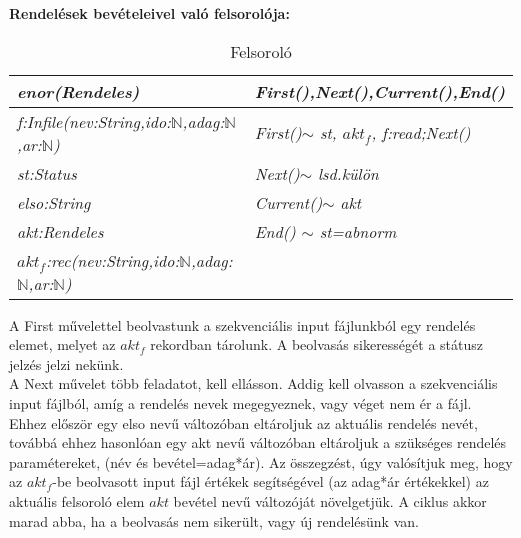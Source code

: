 \noindent\hfill
	\begin{stuki}[12cm]
		\begin{WHILE}{4}{}
			\begin{IF}[70]{2}{}
			\ELSE
			\end{IF}
		\end{WHILE}
	\end{stuki}
\vspace{5mm}
\textbf{Rendelések bevételeivel való felsorolója:}\\
	\begin{table}[htb]
	\caption{Felsoroló}
	\label{tab:Felsorolo}
	\begin{center}
	\begin{tabular}{|l|l|}
		\hline
		\textit{enor(Rendeles)}& \textit{First(),Next(),Current(),End()}\\
		\hline
		\textit{f:Infile(nev:String,ido:$\mathbb{N}$,adag:$\mathbb{N}$,ar:$\mathbb{N}$) }& \textit{First()$\sim$ st, $akt_f$, f:read;Next()}\\
		\textit{st:Status} & \textit{Next()$\sim$ lsd.külön}\\
		\textit{elso:String} & \textit{Current()$\sim$ akt}\\
		\textit{akt:Rendeles} & \textit{End() $\sim$ st=abnorm}\\
		\textit{$akt_f$:rec(nev:String,ido:$\mathbb{N}$,adag:$\mathbb{N}$,ar:$\mathbb{N}$)} & \\
		\hline
	\end{tabular}
	\end{center}
	\end{table}
\indent A First művelettel beolvastunk a szekvenciális input fájlunkból egy rendelés elemet, melyet az $akt_f$ rekordban tárolunk. A beolvasás sikerességét a státusz jelzés jelzi nekünk.\\
\indent A Next művelet több feladatot, kell ellásson. Addig kell olvasson a szekvenciális input fájlból, amíg a rendelés nevek megegyeznek, vagy véget nem ér a fájl. Ehhez először egy elso nevű változóban eltároljuk az aktuális rendelés nevét, továbbá ehhez hasonlóan egy akt nevű változóban eltároljuk a szükséges rendelés paramétereket, (név és bevétel=adag*ár). Az összegzést, úgy valósítjuk meg, hogy az $akt_f$-be beolvasott input fájl értékek segítségével (az adag*ár értékekkel) az aktuális felsoroló elem $akt$ bevétel nevű változóját növelgetjük. A ciklus akkor marad abba, ha a beolvasás nem sikerült, vagy új rendelésünk van.
